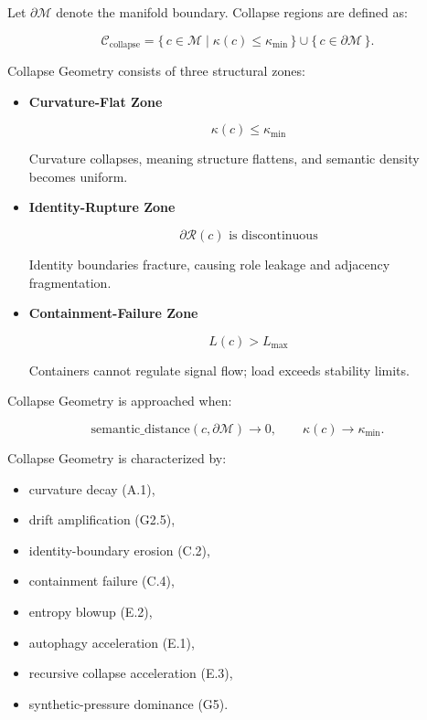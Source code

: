 \medskip

\noindent Let $\partial\mathcal{M}$ denote the manifold boundary. Collapse
regions are defined as:


\[
\mathcal{C}_{\mathrm{collapse}}
=
\{\, c \in \mathcal{M} \mid \kappa(c) \le \kappa_{\min} \,\}
\cup
\{\, c \in \partial\mathcal{M} \,\}.
\]



\noindent Collapse Geometry consists of three structural zones:

\begin{itemize}
    \item \textbf{Curvature-Flat Zone}  
    

\[
    \kappa(c) \le \kappa_{\min}
    \]


    Curvature collapses, meaning structure flattens, and semantic density
    becomes uniform.

    \item \textbf{Identity-Rupture Zone}  
    

\[
    \partial\mathcal{R}(c) \text{ is discontinuous}
    \]


    Identity boundaries fracture, causing role leakage and adjacency
    fragmentation.

    \item \textbf{Containment-Failure Zone}  
    

\[
    L(c) > L_{\max}
    \]


    Containers cannot regulate signal flow; load exceeds stability limits.
\end{itemize}

\medskip

\noindent Collapse Geometry is approached when:


\[
\text{semantic\_distance}(c, \partial\mathcal{M}) \rightarrow 0,
\qquad
\kappa(c) \rightarrow \kappa_{\min}.
\]



\medskip

\noindent Collapse Geometry is characterized by:

\begin{itemize}
    \item curvature decay (A.1),
    \item drift amplification (G2.5),
    \item identity-boundary erosion (C.2),
    \item containment failure (C.4),
    \item entropy blowup (E.2),
    \item autophagy acceleration (E.1),
    \item recursive collapse acceleration (E.3),
    \item synthetic-pressure dominance (G5).
\end{itemize}

